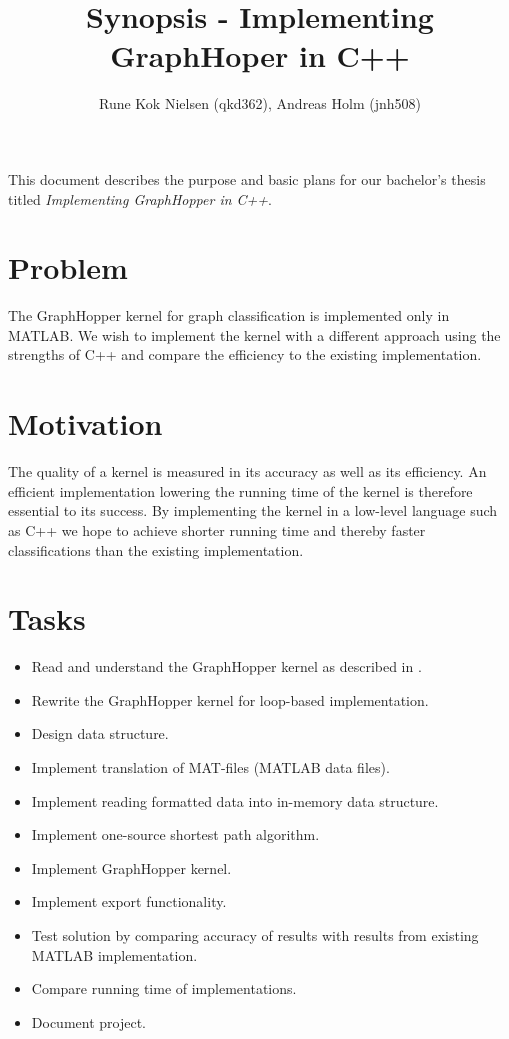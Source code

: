 \documentclass{article}
\author{Rune Kok Nielsen (qkd362), Andreas Holm (jnh508)}
\title{Synopsis - Implementing GraphHoper in C++}
\begin{document}
	
\maketitle

This document describes the purpose and basic plans for our bachelor's thesis titled \textit{Implementing GraphHopper in C++}.

\section{Problem}
The GraphHopper kernel for graph classification is implemented only in MATLAB. We wish to implement the kernel with a different approach using the strengths of C++ and compare the efficiency to the existing implementation.


\section{Motivation}
The quality of a kernel is measured in its accuracy as well as its efficiency. An efficient implementation lowering the running time of the kernel is therefore essential to its success. By implementing the kernel in a low-level language such as C++ we hope to achieve shorter running time and thereby faster classifications than the existing implementation.

\section{Tasks}
\begin{itemize}
	\item Read and understand the GraphHopper kernel as described in \cite{graphhopper}.
	\item Rewrite the GraphHopper kernel for loop-based implementation.
	\item Design data structure.
	\item Implement translation of MAT-files (MATLAB data files).
	\item Implement reading formatted data into in-memory data structure.
	\item Implement one-source shortest path algorithm.
	\item Implement GraphHopper kernel.
	\item Implement export functionality.
	\item Test solution by comparing accuracy of results with results from existing MATLAB implementation.
	\item Compare running time of implementations.
	\item Document project.
\end{itemize}
\end{document}
